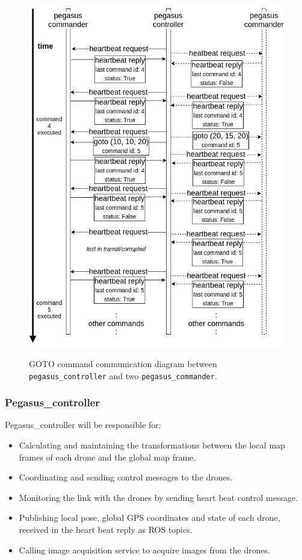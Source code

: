 \begin{figure}
	\centering
	\caption[Communication between \texttt{pegasus\_controller} and two \texttt{pegasus\_commander}.]{\small GOTO command communication diagram between \texttt{pegasus\_controller} and two \texttt{pegasus\_commander}.}
	\includegraphics[width=5in]{figures/methodology/methodology-commander-controller-communication}
	\label{fig:communitation-controller-commander}
\end{figure}

\subsubsection{Pegasus\_controller}

Pegasus\_controller will be responsible for:
\begin{itemize}
	\item Calculating and maintaining the transformations between the local map frames of each drone and the global map frame.
	\item Coordinating and sending control messages to the drones.
	\item Monitoring the link with the drones by sending heart beat control message.
	\item Publishing local pose, global GPS coordinates and state of each drone, received in the heart beat reply as ROS topics.
	\item Calling image acquisition service to acquire images from the drones.
\end{itemize}

